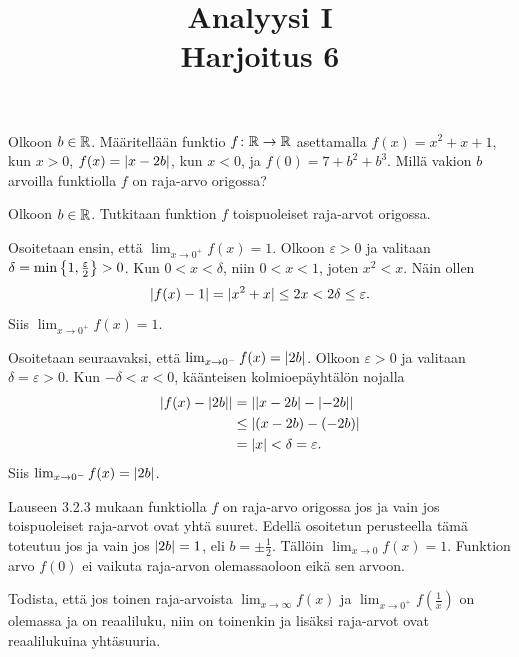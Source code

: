 \documentclass[11pt,a4paper]{amsart}
\title{Analyysi I\\Harjoitus 6}
\author{}
\date{}
\begin{document}

\begin{exercise}
  Olkoon \(b \in \mathbb{R}\). Määritellään funktio \(f\colon \mathbb{R} \to \mathbb{R}\)
  asettamalla \(f(x) = x^2 + x + 1\), kun \(x > 0\),
  \(f(x) = \lvert x - 2b\rvert\), kun \(x < 0\), ja
  \(f(0) = 7 + b^2 + b^3\). Millä vakion \(b\) arvoilla funktiolla
  \(f\) on raja-arvo origossa?
\end{exercise}

\begin{solution}
  Olkoon \(b \in \mathbb{R}\). Tutkitaan funktion \(f\) toispuoleiset
  raja-arvot origossa.

  Osoitetaan ensin, että \(\lim_{x \to 0^+} f(x) = 1\).
  Olkoon \(\varepsilon > 0\) ja valitaan
  \(\delta = \min\left\lbrace1, \frac{\varepsilon}{2}\right\rbrace > 0\).
  Kun \(0 < x < \delta\), niin \(0 < x < 1\), joten \(x^2 < x\).
  Näin ollen
  \[
    \lvert f(x) - 1\rvert = \lvert x^2 + x\rvert
    \leq 2x < 2\delta \leq \varepsilon.
  \]
  Siis \(\lim_{x \to 0^+} f(x) = 1\).

  Osoitetaan seuraavaksi, että \(\lim_{x \to 0^-} f(x) = \lvert2b\rvert\).
  Olkoon \(\varepsilon > 0\) ja valitaan \(\delta = \varepsilon > 0\).
  Kun \(-\delta < x < 0\), käänteisen kolmioepäyhtälön nojalla
  \[
    \begin{aligned}
      \lvert f(x) - \lvert2b\rvert\rvert
      &= \lvert\lvert x - 2b\rvert - \lvert-2b\rvert\rvert \\
      &\leq \lvert(x - 2b) - (-2b)\rvert \\
      &= \lvert x\rvert < \delta = \varepsilon.
    \end{aligned}
  \]
  Siis \(\lim_{x \to 0^-} f(x) = \lvert2b\rvert\).

  Lauseen 3.2.3 mukaan funktiolla \(f\) on raja-arvo origossa jos ja
  vain jos toispuoleiset raja-arvot ovat yhtä suuret. Edellä osoitetun
  perusteella tämä toteutuu jos ja vain jos \(\lvert2b\rvert = 1\), eli
  \(b = \pm\frac{1}{2}\). Tällöin \(\lim_{x \to 0} f(x) = 1\).
  Funktion arvo \(f(0)\) ei vaikuta raja-arvon olemassaoloon eikä sen arvoon.
\end{solution}

\begin{exercise}
  Todista, että jos toinen raja-arvoista \(\lim_{x \to \infty} f(x)\)
  ja \(\lim_{x \to 0^+} f\left(\frac{1}{x}\right)\) on olemassa ja on
  reaaliluku, niin on toinenkin ja lisäksi raja-arvot ovat reaalilukuina
  yhtäsuuria.
\end{exercise}
\end{document}
